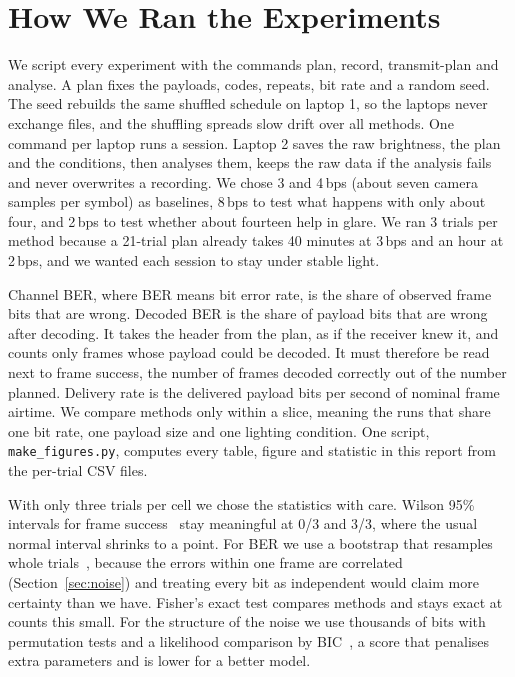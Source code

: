 \documentclass[conference,a4paper]{IEEEtran}
\begin{document}
\section{How We Ran the Experiments}
We script every experiment with the commands plan, record, transmit-plan and
analyse. A plan fixes the payloads, codes, repeats, bit rate and a random seed. The seed rebuilds
the same shuffled schedule on laptop 1, so the laptops never exchange files, and the shuffling
spreads slow drift over all methods. One command per laptop runs a session. Laptop 2 saves the raw
brightness, the plan and the conditions, then analyses them, keeps the raw data if the analysis
fails and never overwrites a recording. We chose 3 and 4\,bps (about seven camera samples per
symbol) as baselines, 8\,bps to test what happens with only about four, and 2\,bps to test whether
about fourteen help in glare. We ran 3 trials per method because a 21-trial plan already takes 40 minutes at
3\,bps and an hour at 2\,bps, and we wanted each session to stay under stable light.

Channel BER, where BER means bit error rate, is the share of observed frame bits
that are wrong. Decoded BER is the share of payload bits that are wrong after decoding. It takes
the header from the plan, as if the receiver knew it, and counts only frames whose payload could be
decoded. It must therefore be read next to frame success, the number of frames decoded correctly
out of the number planned. Delivery rate is the delivered payload bits per second of nominal frame airtime. We compare methods only within a slice, meaning the runs that share one bit rate,
one payload size and one lighting condition. One script, \texttt{make\_figures.py}, computes every
table, figure and statistic in this report from the per-trial CSV files.

With only three trials per cell we chose the statistics with care. Wilson 95\%
intervals for frame success~\cite{wilson} stay meaningful at 0/3 and 3/3, where the usual normal
interval shrinks to a point. For BER we use a bootstrap that resamples whole trials~\cite{efron},
because the errors within one frame are correlated (Section~\ref{sec:noise}) and treating every bit
as independent would claim more certainty than we have. Fisher's exact test compares methods and
stays exact at counts this small. For the structure of the noise we use thousands of bits with
permutation tests and a likelihood comparison by BIC~\cite{schwarz}, a score that penalises extra
parameters and is lower for a better model.
\end{document}

